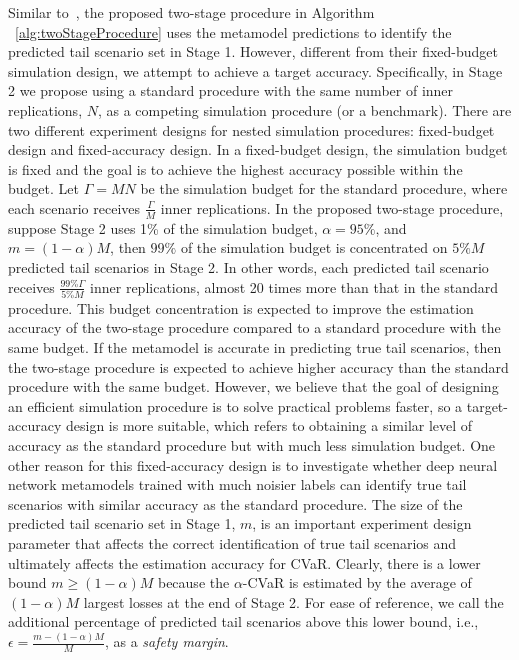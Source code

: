 \documentclass{article}
\begin{document}
Similar to~\cite{dang2020efficient}, the proposed two-stage procedure in Algorithm ~\ref{alg:twoStageProcedure} uses the metamodel predictions to identify the predicted tail scenario set in Stage 1.
However, different from their fixed-budget simulation design, we attempt to achieve a target accuracy.
Specifically, in Stage 2 we propose using a standard procedure with the same number of inner replications, $N$, as a competing simulation procedure (or a benchmark).
There are two different experiment designs for nested simulation procedures: fixed-budget design and fixed-accuracy design.
In a fixed-budget design, the simulation budget is fixed and the goal is to achieve the highest accuracy possible within the budget.
Let $\Gamma = MN$ be the simulation budget for the standard procedure, where each scenario receives $\frac{\Gamma}{M}$ inner replications.
In the proposed two-stage procedure, suppose Stage 2 uses 1\% of the simulation budget, $\alpha = 95\%$, and $m=(1-\alpha)M$, then $99\%$ of the simulation budget is concentrated on $5\% M$ predicted tail scenarios in Stage 2.
In other words, each predicted tail scenario receives $\frac{99\% \Gamma}{5\% M}$ inner replications, almost 20 times more than that in the standard procedure.
This budget concentration is expected to improve the estimation accuracy of the two-stage procedure compared to a standard procedure with the same budget. 
If the metamodel is accurate in predicting true tail scenarios, then the two-stage procedure is expected to achieve higher accuracy than the standard procedure with the same budget.
However, we believe that the goal of designing an efficient simulation procedure is to solve practical problems faster, so a target-accuracy design is more suitable, which refers to obtaining a similar level of accuracy as the standard procedure but with much less simulation budget.
One other reason for this fixed-accuracy design is to investigate whether deep neural network metamodels trained with much noisier labels can identify true tail scenarios with similar accuracy as the standard procedure.
The size of the predicted tail scenario set in Stage 1, $m$, is an important experiment design parameter that affects the correct identification of true tail scenarios and ultimately affects the estimation accuracy for CVaR.
Clearly, there is a lower bound $m \geq (1-\alpha)M$ because the $\alpha$-CVaR is estimated by the average of $(1-\alpha)M$ largest losses at the end of Stage 2.
For ease of reference, we call the additional percentage of predicted tail scenarios above this lower bound, i.e., $\epsilon = \frac{m - (1-\alpha)M}{M}$, as a \textit{safety margin}.
\end{document}
